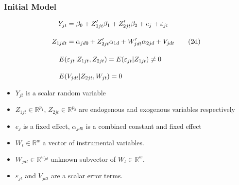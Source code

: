 \documentclass[9pt]{beamer}
\begin{document}
\begin{frame} 
\frametitle{Initial Model} 

\begin{align} 
Y_{jt} &= \beta_0 + Z_{1jt}'\beta_1 + Z_{2jt}'\beta_2 + e_j + \varepsilon_{jt} \\[10pt]
%
Z_{1jdt} &= \alpha_{jd0} + Z_{2jt}' \alpha_{1d} + W_{jdt}' \alpha_{2jd} + V_{jdt} \tag{2d} \\[10pt]
%
\addtocounter {equation} {1}
E(&\varepsilon_{jt} | Z_{1jt} , Z_{2jt}) = E(\varepsilon_{jt} | Z_{1jt}) \neq 0  \\[10pt]
%
E(& V_{jdt} | Z_{2jt},W_{jt}) = 0 
%
\end{align}

\begin{itemize} \addtolength{\itemsep}{\baselineskip}
	    \item $Y_{jt}$ is a scalar random variable
	    \item $ Z_{1jt} \in \mathbb{R}^{p_1}$, $ Z_{2jt} \in \mathbb{R}^{p_2}$ are endogenous and exogenous variables respectively
	    \item $e_j$ is a fixed effect, $\alpha_{jd0}$ is a combined constant and fixed effect
	    \item $ W_{t} \in \mathbb{R}^w$ a vector of instrumental variables.
	    \item $W_{jdt} \in \mathbb{R}^{w_{jd}}$ unknown subvector of $W_t \in \mathbb{R}^w$. 	    \item $\varepsilon_{jt}$ and $V_{jdt}$ are a scalar error terms.
\end{itemize} 

\end{frame}
\end{document}
